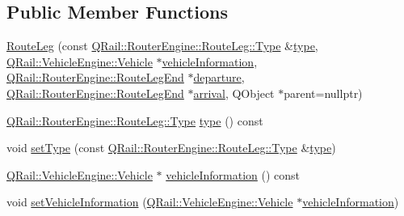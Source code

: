 \subsection*{Public Member Functions}
\begin{DoxyCompactItemize}
\item 
\mbox{\hyperlink{classQRail_1_1RouterEngine_1_1RouteLeg_a05a84e98976f19b3f913acab8758d5f0}{Route\+Leg}} (const \mbox{\hyperlink{classQRail_1_1RouterEngine_1_1RouteLeg_af31dfcc23f2ae80f7fb0feca24cb9816}{Q\+Rail\+::\+Router\+Engine\+::\+Route\+Leg\+::\+Type}} \&\mbox{\hyperlink{classQRail_1_1RouterEngine_1_1RouteLeg_a2d69f7d2225d944e2b34bf2b2e27bd12}{type}}, \mbox{\hyperlink{classQRail_1_1VehicleEngine_1_1Vehicle}{Q\+Rail\+::\+Vehicle\+Engine\+::\+Vehicle}} $\ast$\mbox{\hyperlink{classQRail_1_1RouterEngine_1_1RouteLeg_aab16baf53c857a981e2d9816572818ed}{vehicle\+Information}}, \mbox{\hyperlink{classQRail_1_1RouterEngine_1_1RouteLegEnd}{Q\+Rail\+::\+Router\+Engine\+::\+Route\+Leg\+End}} $\ast$\mbox{\hyperlink{classQRail_1_1RouterEngine_1_1RouteLeg_ae47477e71e222d39e060852e40679ef2}{departure}}, \mbox{\hyperlink{classQRail_1_1RouterEngine_1_1RouteLegEnd}{Q\+Rail\+::\+Router\+Engine\+::\+Route\+Leg\+End}} $\ast$\mbox{\hyperlink{classQRail_1_1RouterEngine_1_1RouteLeg_a64234d433c30c991555722de85094d17}{arrival}}, Q\+Object $\ast$parent=nullptr)
\item 
\mbox{\hyperlink{classQRail_1_1RouterEngine_1_1RouteLeg_af31dfcc23f2ae80f7fb0feca24cb9816}{Q\+Rail\+::\+Router\+Engine\+::\+Route\+Leg\+::\+Type}} \mbox{\hyperlink{classQRail_1_1RouterEngine_1_1RouteLeg_a2d69f7d2225d944e2b34bf2b2e27bd12}{type}} () const
\item 
void \mbox{\hyperlink{classQRail_1_1RouterEngine_1_1RouteLeg_adb34f16e6f424357f16f9be1ed780a33}{set\+Type}} (const \mbox{\hyperlink{classQRail_1_1RouterEngine_1_1RouteLeg_af31dfcc23f2ae80f7fb0feca24cb9816}{Q\+Rail\+::\+Router\+Engine\+::\+Route\+Leg\+::\+Type}} \&\mbox{\hyperlink{classQRail_1_1RouterEngine_1_1RouteLeg_a2d69f7d2225d944e2b34bf2b2e27bd12}{type}})
\item 
\mbox{\hyperlink{classQRail_1_1VehicleEngine_1_1Vehicle}{Q\+Rail\+::\+Vehicle\+Engine\+::\+Vehicle}} $\ast$ \mbox{\hyperlink{classQRail_1_1RouterEngine_1_1RouteLeg_aab16baf53c857a981e2d9816572818ed}{vehicle\+Information}} () const
\item 
void \mbox{\hyperlink{classQRail_1_1RouterEngine_1_1RouteLeg_acee8f4a2cc00033335959a84a7d1448b}{set\+Vehicle\+Information}} (\mbox{\hyperlink{classQRail_1_1VehicleEngine_1_1Vehicle}{Q\+Rail\+::\+Vehicle\+Engine\+::\+Vehicle}} $\ast$\mbox{\hyperlink{classQRail_1_1RouterEngine_1_1RouteLeg_aab16baf53c857a981e2d9816572818ed}{vehicle\+Information}})

\end{DoxyCompactItemize}

